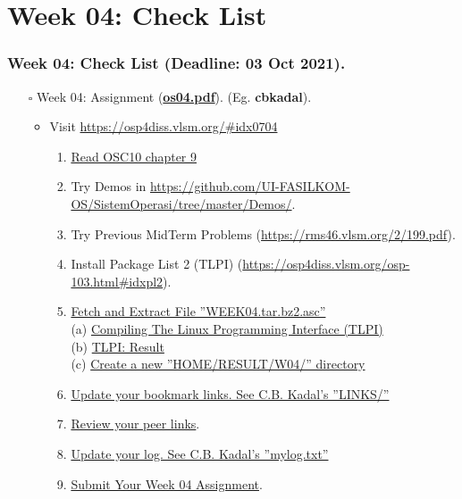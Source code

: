

\section{Week 04: Check List}
\begin{frame}
\frametitle{Week 04: Check List (Deadline: 03 Oct 2021).}
\begin{itemize}
\item [$\square$] Week 04: Assignment (\href{https://os.vlsm.org/Slides/os04.pdf}{\textbf{os04.pdf}}).
(Eg. \textbf{cbkadal}).
\begin{itemize}
\item Visit \url{https://osp4diss.vlsm.org/\#idx0704}
\begin{enumerate}
\item \href{https://www.os-book.com/OS10/slide-dir/}{Read OSC10 chapter 9}
\item Try Demos in {\tiny \url{https://github.com/UI-FASILKOM-OS/SistemOperasi/tree/master/Demos/}}.
\item Try Previous MidTerm Problems {\tiny (\url{https://rms46.vlsm.org/2/199.pdf})}.
\item Install Package List 2 (TLPI) {\tiny (\url{https://osp4diss.vlsm.org/osp-103.html\#idxpl2})}.
\item \href{https://osp4diss.vlsm.org/W04.html}{Fetch and Extract File ''WEEK04.tar.bz2.asc''}\\
(a) \href{https://osp4diss.vlsm.org/W04-01.html}{Compiling The Linux Programming Interface (TLPI)}\\
(b) \href{https://osp4diss.vlsm.org/W04-02.html}{TLPI: Result}\\
(c) \href{https://osp4diss.vlsm.org/W04-03.html}{Create a new ''HOME/RESULT/W04/'' directory}\\
\item \href{https://cbkadal.github.io/os212/LINKS/}{Update your bookmark links. See C.B. Kadal's ''LINKS/''}
\item \href{https://osp4diss.vlsm.org/W02-05.html}{Review your peer links}.
\item \href{https://cbkadal.github.io/os212/TXT/mylog.txt}{Update your log. See C.B. Kadal's ''mylog.txt''}
\item \href{https://osp4diss.vlsm.org/W03-06.html}{Submit Your Week 04 Assignment}.
\end{enumerate}
\end{itemize}
\end{itemize}
\end{frame}
